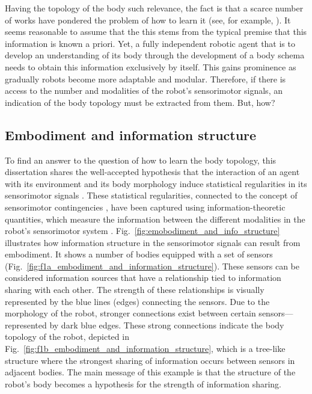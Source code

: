 Having the topology of the body such relevance, the fact is that a scarce number of works have pondered the problem of how to learn it (see, for example, \cite{Bongard2006Resilientmachinescontinuous}). It seems reasonable to assume that the this stems from the typical premise that this information is known a priori. Yet, a fully independent robotic agent that is to develop an understanding of its body through the development of a body schema needs to obtain this information exclusively by itself. This gains prominence as gradually robots become more adaptable and modular. Therefore, if there is access to the number and modalities of the robot's sensorimotor signals, an indication of the body topology must be extracted from them. But, how?

\subsection{Embodiment and information structure}
To find an answer to the question of how to learn the body topology, this dissertation shares the well-accepted hypothesis that the interaction of an agent with its environment and its body morphology induce statistical regularities in its sensorimotor signals \cite{Pfeifer2006InformationTheoreticImplications,Pfeifer2007SelfOrganizationEmbodiment,LungarellaEmbodimentInformationCausal,Pfeifer2006Howbodyshapes}. These statistical regularities, connected to the concept of sensorimotor contingencies \cite{Jacquey2019Sensorimotorcontingenciesas}, have been captured using information-theoretic quantities, which measure the information between the different modalities in the robot's sensorimotor system \cite{Schmidt2013Bootstrappingperceptionusing,Lungarella2006Mappinginformationflow,Polani2009Modelsinformationprocessing,Bossomaier2016introductiontransferentropy,Olsson2006unknownsensorsactuators}. Fig.~\ref{fig:emobodiment_and_info_structure} illustrates how information structure in the sensorimotor signals can result from embodiment. It shows a number of bodies equipped with a set of sensors (Fig.~\ref{fig:f1a_embodiment_and_information_structure}). These sensors can be considered information sources that have a relationship tied to information sharing with each other. The strength of these relationships is visually represented by the blue lines (edges) connecting the sensors. Due to the morphology of the robot, stronger connections exist between certain sensors---represented by dark blue edges. These strong connections indicate the body topology of the robot, depicted in Fig.~\ref{fig:f1b_embodiment_and_information_structure}, which is a tree-like structure where the strongest sharing of information  occurs between sensors in adjacent bodies. The main message of this example is that the structure of the robot's body becomes a hypothesis for the strength of information sharing.

